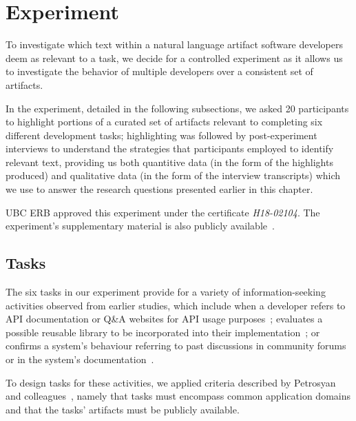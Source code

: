 
\section{Experiment}
\label{cp3:experiment}



To investigate which text within a natural language artifact software developers deem as relevant to a task,
 we decide for a controlled experiment
 as it allows us to investigate the behavior of multiple developers
over a consistent set of artifacts.



In the experiment, detailed in the following subsections,
we asked 20 participants to highlight portions of a curated
set of artifacts relevant to completing six different development tasks;
 highlighting was followed by post-experiment 
interviews to understand the
strategies that participants employed to identify relevant text,
providing us both 
quantitive data (in the form of the highlights produced) 
and qualitative data (in the form of the interview transcripts) 
which we use to answer the research questions 
presented earlier in this chapter.






\acs{UBC} \acs{ERB} approved this experiment under the certificate \textit{H18-02104}.
The experiment's supplementary material is also publicly available~\cite{cp3_supplementary_material}.




\subsection{Tasks}
\label{cp3:method-tasks}


The six tasks in our experiment provide for a variety of information-seeking activities observed from earlier
studies, which include when a developer
refers to API documentation or Q\&A websites for API usage purposes~\cite{umarji2008archetypal, Singer1998,robillard2011field};
evaluates a possible reusable library to be incorporated into their implementation~\cite{umarji2008archetypal}; or
confirms a system's behaviour referring to past discussions in community forums or in the system's documentation~\cite{umarji2008archetypal, Lotufo2012, Singer1998}.


To design tasks for these activities, we applied criteria described by Petrosyan and colleagues~\cite{Petrosyan2015}, namely that
tasks must encompass common application domains and that the tasks' artifacts must be publicly available.


